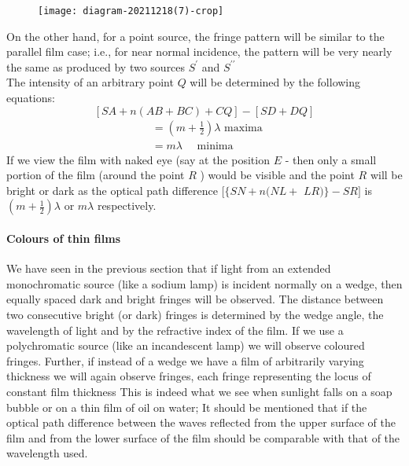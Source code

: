 \begin{figure}[H]
	\centering
	\texttt{[image: diagram-20211218(7)-crop]}
	\caption{}
	\label{}
\end{figure}
On the other hand, for a point source, the fringe pattern will be similar to the parallel film case; i.e., for near normal incidence, the pattern will be very nearly the same as produced by two sources $S^{\prime}$ and $S^{\prime \prime}$ \\
The intensity of an arbitrary point $Q$ will be determined by the following equations:
$$[S A+n(A B+B C)+C Q]-[S D+D Q]$$
$$\begin{aligned}
&=\left(m+\frac{1}{2}\right) \lambda \text { maxima } \\
&=m \lambda \quad \text { minima }
\end{aligned}$$
If we view the film with naked eye (say at the position $E$ - then only a small portion of the film (around the point $R$ ) would be visible and the point $R$ will be bright or dark as the optical path difference $[\{S N+n(N L+$ $L R)\}-S R]$ is $\left(m+\frac{1}{2}\right) \lambda$ or $m \lambda$ respectively. 
\paragraph{Colours of thin films}
We have seen in the previous section that if light from an extended monochromatic source (like a sodium lamp) is incident normally on a wedge, then equally spaced dark and bright fringes will be observed. The distance between two consecutive bright (or dark) fringes is determined by the wedge angle, the wavelength of light and by the refractive index of the film. If we use a polychromatic source (like an incandescent lamp) we will observe coloured fringes. Further, if instead of a wedge we have a film of arbitrarily varying thickness we will again observe fringes, each fringe representing the locus of constant film thickness This is indeed what we see when sunlight falls on a soap bubble or on a thin film of oil on water; It should be mentioned that if the optical path difference between the waves reflected from the upper surface of the film and from the lower surface of the film should be comparable with that of the wavelength used.
